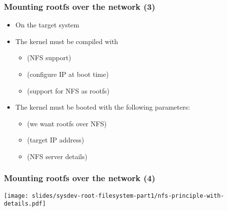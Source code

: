 \begin{frame}
  \frametitle{Mounting rootfs over the network (3)}
  \begin{itemize}
  \item On the target system
  \item The kernel must be compiled with
    \begin{itemize}
    \item {} (NFS support)
    \item {} (configure IP at boot time)
    \item {} (support for NFS as rootfs)
    \end{itemize}
  \item The kernel must be booted with the following parameters:
    \begin{itemize}
    \item {} (we want rootfs over NFS)
    \item {} (target IP address)
    \item {} (NFS server details)
    \end{itemize}
  \end{itemize}
\end{frame}

\begin{frame}
  \frametitle{Mounting rootfs over the network (4)}
  \begin{center}
    \texttt{[image: slides/sysdev-root-filesystem-part1/nfs-principle-with-details.pdf]}
  \end{center}
\end{frame}

